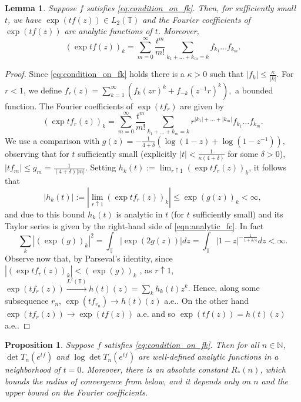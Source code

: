 \documentclass[11pt]{amsart}
\theoremstyle{plain}
\newtheorem{lemma}[theorem]{Lemma}
\newtheorem{proposition}[theorem]{Proposition}
\theoremstyle{remark}
\numberwithin{equation}{section}
\begin{document}
\begin{lemma}\label{lemma:barely_coefficients}
Suppose $f$ satisfies \eqref{eq:condition_on_fk}. Then, for sufficiently small $t$, we have $\exp({tf(z)})\in L_2(\mathbb T)$ and  the Fourier coefficients of $\exp({tf(z)})$ are analytic functions of $t$. Moreover, 
\begin{equation}\label{eqn:analytic_fc}
\left( \exp{tf(z)} \right)_k=\sum_{m=0}^{\infty}\frac{t^m}{m!}\sum_{k_1+\ldots+k_m=k} f_{k_1}\ldots f_{k_m}.
\end{equation}
\end{lemma}
\begin{proof}
Since \eqref{eq:condition_on_fk} holds there is a $\kappa>0$ such that $|f_k|\leq \frac{\kappa}{|k|}$.
For $r<1$, we define $f_r(z)=\sum_{k=1}^{\infty} (f_k(zr)^k+f_{-k}(z^{-1}r)^k),$ a bounded function. The Fourier coefficients of $\exp(tf_r)$ are given by 
$$\left( \exp{tf_r(z)} \right)_k=\sum_{m=0}^{\infty}\frac{t^m}{m!}\sum_{k_1+\ldots+k_m=k} r^{|k_1|+\ldots +|k_m|} f_{k_1}\ldots f_{k_m}.$$ 
We use a comparison with $g(z)=-\frac{1}{4+\delta}\left(\log(1-z)+\log(1-z^{-1})\right),$
observing that for $t$ sufficiently small (explicitly $|t|<\frac{1}{\kappa(4+\delta)}$ for some $\delta>0$), $|tf_m|\leq g_m=\frac{1}{(4+\delta)|m|}.$ 
Setting $h_k(t):=\lim_{r\uparrow 1}\left( \exp{tf_r(z)} \right)_k$, it follows that
$$
|h_k(t)|:=|\lim_{r\uparrow 1}\left( \exp{tf_r(z)} \right)_k|\leq \exp(g(z))_k<\infty,
$$
and due to this bound $h_k(t)$ is analytic in $t$ (for $t$ sufficiently small) and its Taylor series is given by the right-hand side of \eqref{eqn:analytic_fc}.
In fact $$\sum_k |(\exp(g))_k|^2=\int_{\mathbb{T}}\left|\exp(2g(z))\right|dz=\int_{\mathbb{T}}|1-z|^{-\frac{1}{1+\delta/4}}dz<\infty.$$
Observe now that, by Parseval's identity, since $|\left( \exp{tf_r(z)} \right)_k|<(\exp(g))_k$  , as $r\uparrow 1$, $\exp(tf_r(z))\xrightarrow{L^2(\mathbb{T})} h(t)(z)=\sum_{k}h_k(t)z^k$. Hence, along some subsequence $r_n$, $\exp(t f_{r_n})\rightarrow h(t)(z)$ a.e.. On the other hand $\exp(tf_r(z))\rightarrow \exp(tf(z))$ a.e. and so $\exp(tf(z))=h(t)(z)$ a.e.. 
\end{proof}



%
%
%
%



\begin{proposition}\label{prop:analyticity_unbounded}
Suppose $f$ satisfies \eqref{eq:condition_on_fk}. Then for all $n\in\mathbb{N}$, $\det T_n(e^{tf})$ and $\log\det T_n(e^{tf})$ are well-defined analytic functions in a neighborhood of $t=0$. Moreover, there is an absolute constant $R_*(n)$, which bounds the radius of convergence from below, and it depends only on $n$ and the upper bound on the Fourier coefficients.
\end{proposition}
\end{document}
